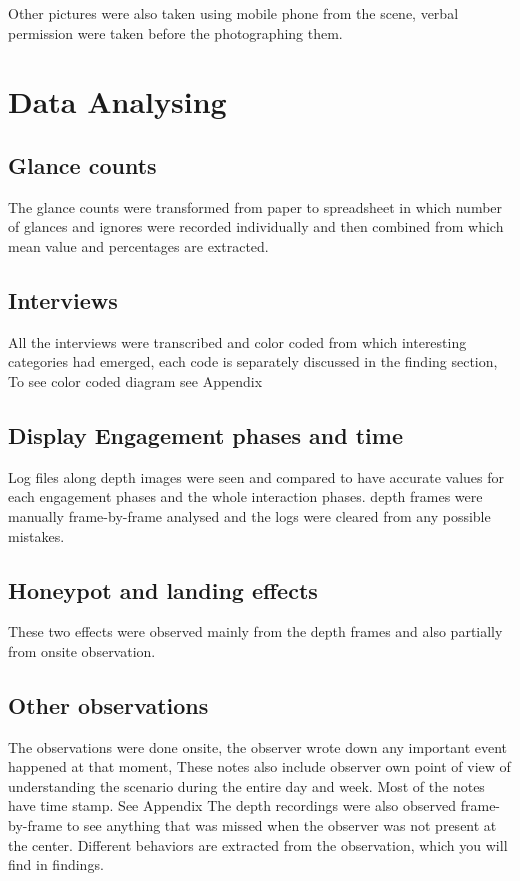 Other pictures were also taken using mobile phone from the scene, verbal permission were taken before the photographing them.


\section{Data Analysing}
\subsection {Glance counts} 
The glance counts were transformed from paper to spreadsheet in which number of glances and ignores were recorded individually and then combined from which mean value and percentages are extracted.

\subsection {Interviews} 
All the interviews were transcribed and color coded from which interesting categories had emerged, each code is separately discussed in the finding section, To see color coded diagram see Appendix


\subsection {Display Engagement phases and time} 
Log files along depth images were seen and compared to have accurate values for each engagement phases and the whole interaction phases. depth frames were manually frame-by-frame analysed and the logs were cleared from any possible mistakes.

\subsection {Honeypot and landing effects}
These two effects were observed mainly from the depth frames and also partially from onsite observation.

\subsection {Other observations}
The observations were done onsite, the observer wrote down any important event happened at that moment, These notes also include observer own point of view of understanding the scenario during the entire day and week. Most of the notes have time stamp. See Appendix
The depth recordings were also observed frame-by-frame to see anything that was missed when the observer was not present at the center. Different behaviors are extracted from the observation, which you will find in findings.


